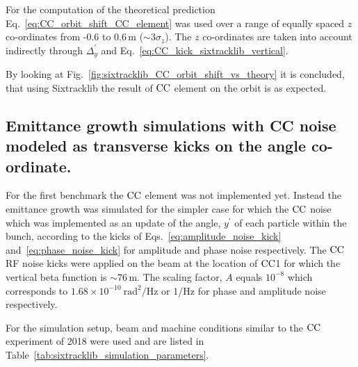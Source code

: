 For the computation of the theoretical prediction Eq.~\eqref{eq:CC_orbit_shift_CC_element} was used over a range of equally spaced $z$ co-ordinates from -0.6 to 0.6\,m ($\sim 3 \sigma_z$). The $z$ co-ordinates are taken into account indirectly through $\Delta_y^\prime$ and Eq.~\eqref{eq:CC_kick_sixtracklib_vertical}.

By looking at Fig.~\ref{fig:sixtracklib_CC_orbit_shift_vs_theory} it is concluded, that using Sixtracklib the result of ${\mathrm{CC}}$ element on the orbit is as expected. %


\subsection{Emittance growth simulations with CC noise modeled as transverse kicks on the angle co-ordinate.}\label{subsec:sixtracklib_kicks_transverse_angle}

For the first benchmark the ${\mathrm{CC}}$ element was not implemented yet. Instead the emittance growth was simulated for the simpler case for which the ${\mathrm{CC}}$ noise which was implemented as an update of the angle, $y^\prime$ of each particle within the bunch, according to the kicks of Eqs.~\eqref{eq:amplitude_noise_kick} and~\eqref{eq:phase_noise_kick} for amplitude and phase noise respectively. The ${\mathrm{CC}}$ RF noise kicks were applied on the beam at the location of ${\mathrm{CC}}$1 for which the vertical beta function is $\sim$76\,m. The scaling factor, $A$ equals $10^{-8}$ which corresponds to $1.68 \times 10^{-10} \ \mathrm{rad^2/Hz}$ or 1/Hz for phase and amplitude noise respectively.

For the simulation setup, beam and machine conditions similar to the ${\mathrm{CC}}$ experiment of 2018 were used and are listed in Table~\ref{tab:sixtracklib_simulation_parameters}.

